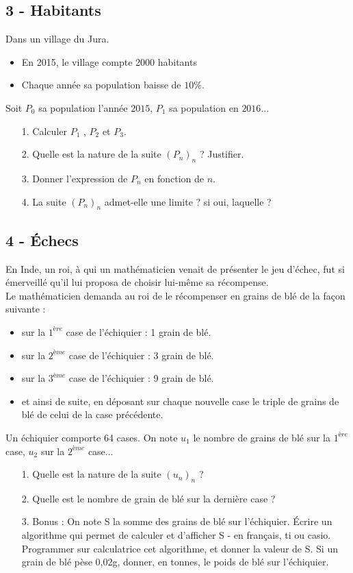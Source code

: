\documentclass[12pt]{article}
\begin{document}
\begin{multicols}{2}
\subsection*{3 - Habitants}

Dans un village du Jura.
\begin{itemize}
\item En 2015, le village compte 2000 habitants
\item Chaque année sa population baisse de $10 \%$.
\end{itemize}
Soit $P_0$ sa population l’année $2015$, $P_1$ sa population en $2016$...

\begin{enumerate}
\item[1.] Calculer $P_1$ , $P_2$ et $P_3$.
\item[2.] Quelle est la nature de la suite $(P_n)_n$ ? Justifier.
\item[3.] Donner l’expression de $P_n$ en fonction de $n$.
\item[4.] La suite $(P_n)_n$ admet-elle une limite ? si oui, laquelle ?
\end{enumerate}

\noindent\hrulefill

\subsection*{4 - Échecs}

En Inde, un roi, à qui un mathématicien venait de présenter le jeu d'échec, fut si émerveillé qu'il lui proposa de choisir lui-même sa récompense. \\
Le mathématicien demanda au roi de le récompenser en grains de blé de la façon suivante :

\begin{itemize}
\item sur la $1^{ère}$ case de l'échiquier : 1 grain de blé.
\item sur la $2^{ème}$ case de l'échiquier : 3 grain de blé.
\item sur la $3^{ème}$ case de l'échiquier : 9 grain de blé.
\item et ainsi de suite, en déposant sur chaque nouvelle case le triple de grains de blé de celui de la case précédente.
\end{itemize}

Un  échiquier comporte 64 cases. On note $u_1$ le nombre de grains de blé sur la $1^{ère}$ case, $u_2$ sur la $2^{ème}$ case...

\begin{enumerate}
\item[1.] Quelle est la nature de la suite $(u_n)_n$ ?
\item[2.] Quelle est le nombre de grain de blé sur la dernière case ?
\item[3.] Bonus : On note S la somme des grains de blé sur l'échiquier.
Écrire un algorithme qui permet de calculer et d’afficher S - en français, ti ou casio.
Programmer sur calculatrice cet algorithme, et donner la valeur de S. Si un grain de blé pèse 0,02g, donner, en tonnes, le poids de blé sur l'échiquier.
\end{enumerate}

\end{multicols}
\end{document}
